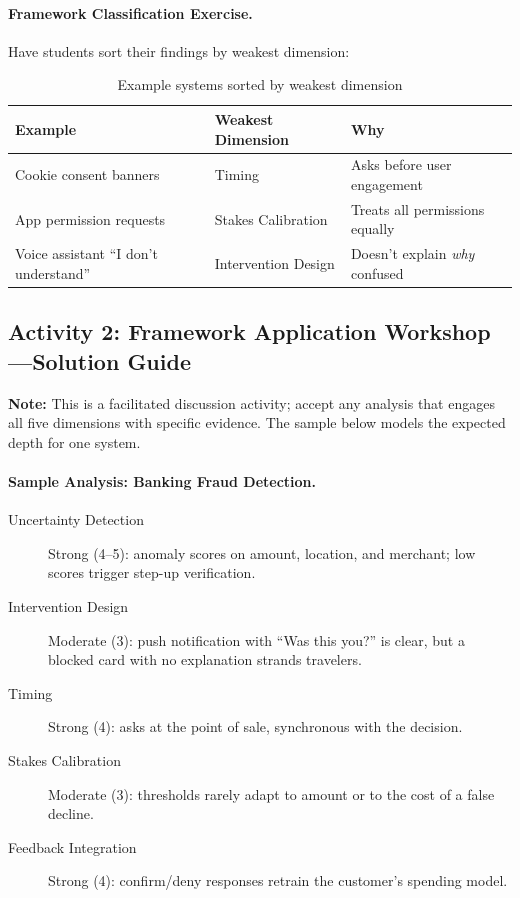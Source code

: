 \paragraph{Framework Classification Exercise.}

Have students sort their findings by weakest dimension:

\begin{table}[htbp]
\caption{Example systems sorted by weakest dimension}
\label{tab:weakest-dimension}
\centering
\begin{tabular}{@{}p{4cm}p{3.5cm}p{4cm}@{}}
\toprule
\textbf{Example} & \textbf{Weakest Dimension} & \textbf{Why} \\
\midrule
Cookie consent banners & Timing & Asks before user engagement \\
App permission requests & Stakes Calibration & Treats all permissions equally \\
Voice assistant ``I don't understand'' & Intervention Design & Doesn't explain \emph{why} confused \\
\bottomrule
\end{tabular}
\end{table}

\subsection{Activity 2: Framework Application Workshop---Solution Guide}

\textbf{Note:} This is a facilitated discussion activity; accept any analysis that
engages all five dimensions with specific evidence. The sample below models the
expected depth for one system.

\paragraph{Sample Analysis: Banking Fraud Detection.}
\begin{description}
    \item[Uncertainty Detection] Strong (4--5): anomaly scores on amount,
        location, and merchant; low scores trigger step-up verification.
    \item[Intervention Design] Moderate (3): push notification with
        ``Was this you?'' is clear, but a blocked card with no explanation
        strands travelers.
    \item[Timing] Strong (4): asks at the point of sale, synchronous with
        the decision.
    \item[Stakes Calibration] Moderate (3): thresholds rarely adapt to
        amount or to the cost of a false decline.
    \item[Feedback Integration] Strong (4): confirm/deny responses retrain
        the customer's spending model.
\end{description}

